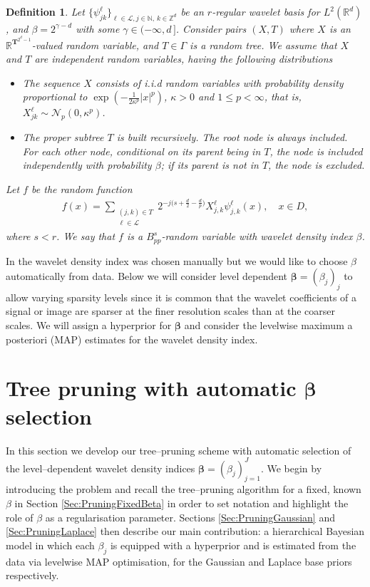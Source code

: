 \documentclass[11pt,a4paper]{article}
\newcommand{\kauno}{{\mathcal L}}
\newcommand{\Nn}{{\mathcal N}}
\newcommand{\Tt}{{\Gamma}}
\newcommand{\oT}{\boldsymbol{T}}
\newcommand{\N}{\mathbb{N}}
\newcommand{\R}{\mathbb{R}}
\newcommand{\Z}{\mathbb{Z}}
\newtheorem{definition}{Definition}
\begin{document}
\begin{definition}\label{Def:TreeRandomVariable}
Let $\{\psi^\ell_{jk}\}_{\ell\in\kauno, j\in\N,\,k\in\Z^d}$ be an $r$-regular wavelet basis for $L^2(\R^d)$, and $\beta=2^{\gamma-d}$ with some $\gamma\in(-\infty,d\,]$. Consider pairs $(X,T)$ where $X$ is an $\R^{\oT^{2^d-1}}$-valued random variable, and $T\in {\Tt}$ is a random tree. We assume that $X$ and $T$ are independent random variables, having the following distributions
\begin{itemize}
\item The sequence $X$ consists of i.i.d random variables  with probability density proportional to $\exp (-\frac{1}{2\kappa^p}|x|^{p})$, $\kappa>0$ and $1\leq p <\infty$, that is, $X_{jk}^\ell\sim\Nn_p(0,\kappa^p)$.
\item The proper subtree $T$ is built recursively. The root node is always included. For each other node, conditional on its parent being in $T$, the node is included independently with probability $\beta$; if its parent is not in $T$, the node is excluded.
\end{itemize}
Let $f$ be the random function
\begin{align*}
f(x)=\sum_{\substack{(j,k)\in T\\ \ell\in\kauno}}
2^{-j\big(s+\frac d2-\frac dp\big)}X^\ell_{j,k}\psi^\ell_{j,k}(x),\quad x\in D,
\end{align*}
where $s<r$. We say that $f$ is a $B^{s}_{pp}$-random variable with wavelet density index $\beta$.
\end{definition}

In \cite{Kekkonen2023} the wavelet density index was chosen manually but we would like to choose $\beta$ automatically from data.
Below we will consider level dependent $\boldsymbol{\beta}=(\beta_j)_j$ to allow varying sparsity levels since it is common that the wavelet coefficients of a signal or image are sparser at the finer resolution scales than at the coarser scales. 
We will assign a hyperprior for $\boldsymbol{\beta}$ and consider the levelwise maximum a posteriori (MAP) estimates for the wavelet density index. 


\section{Tree pruning with automatic $\boldsymbol{\beta}$ selection \label{Sec:BetaSelection}}

In this section we develop our tree–pruning scheme with automatic selection of the level–dependent wavelet density indices $\boldsymbol{\beta}=(\beta_j)_{j=1}^J$. We begin by introducing the problem and recall the tree–pruning algorithm for a fixed, known $\beta$ in Section \ref{Sec:PruningFixedBeta} in order to set notation and highlight the role of $\beta$ as a regularisation parameter. Sections \ref{Sec:PruningGaussian} and \ref{Sec:PruningLaplace} then describe our main contribution: a hierarchical Bayesian model in which each $\beta_j$ is equipped with a hyperprior and is estimated from the data via levelwise MAP optimisation, for the Gaussian and Laplace base priors respectively. 
\end{document}
